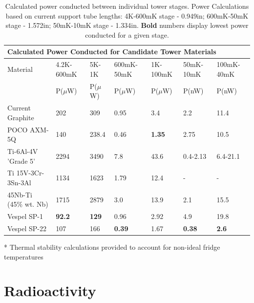 \documentclass{report}
\begin{document}
\begin{table}[htb]
\begin{threeparttable}
{\footnotesize\rm\begin{tabularx}{17.7cm}{l|XXXXXX}
  \multicolumn{7}{l}{{\large Calculated Power Conducted for Candidate Tower Materials}}\\
\toprule
 {\normalsize Material} & 4.2K-600mK  &5K-1K\tnote{*}& 600mK-50mK & 1K-100mK\tnote{*} & 50mK-10mK & 100mK-40mK\tnote{*} \\
  &P($\mu$W)&P($\mu$W)&P($\mu$W)&P($\mu$W)& P(nW) & P(nW) \\ \hline\hline
  Current Graphite & 202 & 309 & 0.95 & 3.4 & 2.2 & 11.4 \\
  POCO AXM-5Q & 140 & 238.4 & 0.46 & \textbf{1.35} & 2.75 & 10.5 \\
  Ti-6Al-4V 'Grade 5' & 2294 & 3490 & 7.8 & 43.6 & 0.4-2.13 & 6.4-21.1 \\
  Ti 15V-3Cr-3Sn-3Al & 1134 & 1623 & 1.79 & 12.4 & - & - \\
  45Nb-Ti (45\% wt. Nb) & 1715 & 2879 & 3.0 & 13.9 & 2.1 & 15.5 \\
  Vespel SP-1 & \textbf{92.2} & \textbf{129} & 0.96 & 2.92 & 4.9 & 19.8 \\
  Vespel SP-22 & 107 & 166 & \textbf{0.39} & 1.67 & \textbf{0.38} & \textbf{2.6} \\
\bottomrule
\end{tabularx}
\begin{tablenotes}
   \item[*]{Thermal stability calculations provided to account for non-ideal fridge temperatures}
\end{tablenotes}}
\caption{Calculated power conducted between individual tower stages. Power Calculations
based on current support tube lengths: 4K-600mK stage - 0.949in; 600mK-50mK stage - 1.572in;
50mK-10mK stage - 1.334in. \textbf{Bold} numbers display lowest power conducted for a given
stage.}
\end{threeparttable}
\end{table}


\section{Radioactivity}
\end{document}
